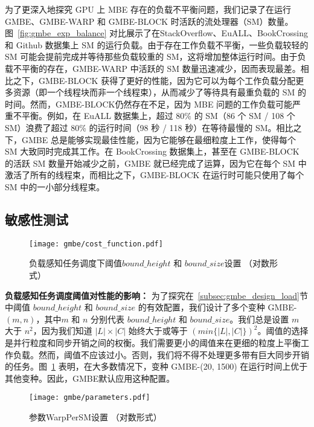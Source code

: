 为了更深入地探究 GPU 上 MBE 存在的负载不平衡问题，我们记录了在运行 GMBE、GMBE-WARP 和 GMBE-BLOCK 时活跃的流处理器（SM）数量。图~\ref{fig:gmbe_exp_balance} 对比展示了在StackOverflow、EuALL、BookCrossing 和 Github 数据集上 SM 的运行负载。由于存在工作负载不平衡，一些负载较轻的 SM 可能会提前完成并等待那些负载较重的 SM，这将增加整体运行时间。由于负载不平衡的存在，GMBE-WARP 中活跃的 SM 数量迅速减少，因而表现最差。相比之下，GMBE-BLOCK 获得了更好的性能，因为它可以为每个工作负载分配更多资源（即一个线程块而非一个线程束），从而减少了等待具有最重负载的 SM 的时间。然而，GMBE-BLOCK仍然存在不足，因为 MBE 问题的工作负载可能严重不平衡。例如，在 EuALL 数据集上，超过 80\% 的 SM（86 个 SM / 108 个 SM）浪费了超过 80\% 的运行时间（98 秒 / 118 秒）在等待最慢的 SM。相比之下，GMBE 总是能够实现最佳性能，因为它能够在最细粒度上工作，使得每个 SM 大致同时完成其工作。在 BookCrossing 数据集上，甚至在 GMBE-BLOCK 的活跃 SM 数量开始减少之前，GMBE 就已经完成了运算，因为它在每个 SM 中激活了所有的线程束，而相比之下，GMBE-BLOCK 在运行时可能只使用了每个 SM 中的一小部分线程束。

\subsection{敏感性测试}
\label{subsec:gmbe_sensitivity}


\begin{figure} [H]
	\centering
  \vspace{0.1in}
	\texttt{[image: gmbe/cost\_function.pdf]}	
	\vspace{0.1in}
  \caption{负载感知任务调度下阈值$bound\_height$ 和 $bound\_size$设置 （对数形式）}
	\label{fig:gmbe_exp_cost}
\end{figure}


\textbf{负载感知任务调度阈值对性能的影响：} 为了探究在~\ref{subsec:gmbe_design_load}节中阈值 $bound\_height$ 和 $bound\_size$ 的有效配置，我们设计了多个变种 GMBE-$(m, n)$，其中$m$ 和 $n$ 分别代表 $bound\_height$ 和 $bound\_size$。我们总是设置 $m$ 大于 $n^2$，因为我们知道  $|L|\times|C|$ 始终大于或等于 $(min\{|L|,|C|\})^2$。阈值的选择是并行粒度和同步开销之间的权衡。我们需要更小的阈值来在更细的粒度上平衡工作负载。然而，阈值不应该过小。否则，我们将不得不处理更多带有巨大同步开销的任务。图~\ref{fig:gmbe_exp_cost} 表明，在大多数情况下，变种 GMBE-(20, 1500) 在运行时间上优于其他变种。因此，GMBE默认应用这种配置。


\begin{figure} [H]
	\centering
  \vspace{0.1in}
	\texttt{[image: gmbe/parameters.pdf]}	
	\vspace{0.1in}
  \caption{参数\textsf{WarpPerSM}设置 （对数形式）}
	\label{fig:gmbe_exp_config}
\end{figure}

